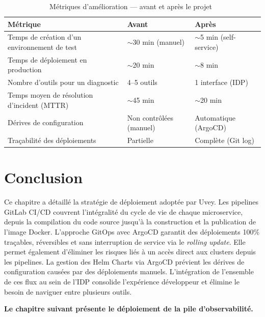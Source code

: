 \begin{table}[H]
  \centering
  \renewcommand{\arraystretch}{1.4}
  \begin{tabularx}{\textwidth}{L{6cm} C{3.5cm} C{3.5cm}}
    \toprule
    \textbf{Métrique} & \textbf{Avant} & \textbf{Après} \\
    \midrule
    Temps de création d'un environnement de test & $\sim$30 min (manuel) & $\sim$5 min (self-service) \\
    Temps de déploiement en production & $\sim$20 min & $\sim$8 min \\
    Nombre d'outils pour un diagnostic & 4--5 outils & 1 interface (\ac{IDP}) \\
    Temps moyen de résolution d'incident (\ac{MTTR}) & $\sim$45 min & $\sim$20 min \\
    Dérives de configuration & Non contrôlées (manuel) & Automatique (ArgoCD) \\
    Traçabilité des déploiements & Partielle & Complète (Git log) \\
    \bottomrule
  \end{tabularx}
  \caption{Métriques d'amélioration --- avant et après le projet~\cite{dora2023}}
  \label{tab:resultats}
\end{table}

\section*{Conclusion}

Ce chapitre a détaillé la stratégie de déploiement adoptée par Uvey. Les pipelines GitLab \ac{CI/CD} couvrent l'intégralité du cycle de vie de chaque microservice, depuis la compilation du code source jusqu'à la construction et la publication de l'image Docker. L'approche GitOps avec ArgoCD garantit des déploiements 100\% traçables, réversibles et sans interruption de service via le \textit{rolling update}. Elle permet également d'éliminer les risques liés à un accès direct aux clusters depuis les pipelines. La gestion des Helm Charts via ArgoCD prévient les dérives de configuration causées par des déploiements manuels. L'intégration de l'ensemble de ces flux au sein de l'\ac{IDP} consolide l'expérience développeur et élimine le besoin de naviguer entre plusieurs outils. 

\textbf{Le chapitre suivant présente le déploiement de la pile d'observabilité.}
